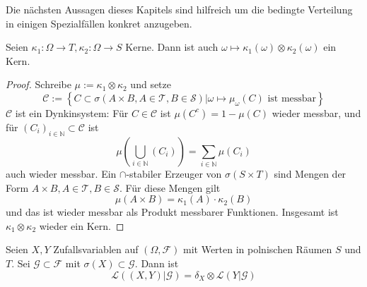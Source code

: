 Die nächsten Aussagen dieses Kapitels sind hilfreich um die bedingte Verteilung in einigen Spezialfällen konkret anzugeben.
\begin{lemma}\label{thm:kernel_prod}
Seien $\kappa_1: \Omega\rightarrow T,\kappa_2: \Omega\rightarrow S$ Kerne. Dann ist auch $\omega \mapsto \kappa_1(\omega) \otimes \kappa_2(\omega)$ ein Kern.
\end{lemma}
\begin{proof}
Schreibe $\mu:=\kappa_1\otimes\kappa_2$ und setze 
$$\mathcal{C}:=\left\{C\subset\sigma(A\times B, A\in\mathcal{T}, B\in\mathcal{S})\vert \omega \mapsto \mu_\omega(C) \text{ ist messbar}\right\}$$
$\mathcal{C}$ ist ein Dynkinsystem: Für $C\in\mathcal{C}$ ist $\mu(C^c)=1-\mu(C)$ wieder messbar, und für $(C_i)_{i\in\mathbb{N}}\subset \mathcal{C}$ ist 
$$\mu(\bigcup_{i\in\mathbb{N}}(C_i))=\sum_{i\in\mathbb{N}}\mu(C_i)$$
auch wieder messbar. Ein $\cap$-stabiler Erzeuger von $\sigma(S\times T)$ sind Mengen der Form $A\times B, A\in \mathcal{T}, B\in\mathcal{S}$. Für diese Mengen gilt
$$\mu(A\times B) = \kappa_1(A)\cdot\kappa_2(B)$$
und das ist wieder messbar als Produkt messbarer Funktionen. Insgesamt ist $\kappa_1\otimes\kappa_2$ wieder ein Kern.
\end{proof}
\begin{lemma}\label{thm:determined_kernel}
Seien $X, Y$ Zufallsvariablen auf $(\Omega, \mathcal{F})$ mit Werten in polnischen Räumen $S$ und $T$. Sei $\mathcal{G}\subset \mathcal{F}$ mit $\sigma(X)\subset \mathcal{G}$. Dann ist 
$$\mathcal{L}\left((X,Y)\vert \mathcal{G}\right) = \delta_X \otimes \mathcal{L}(Y\vert \mathcal{G})$$
\end{lemma}
